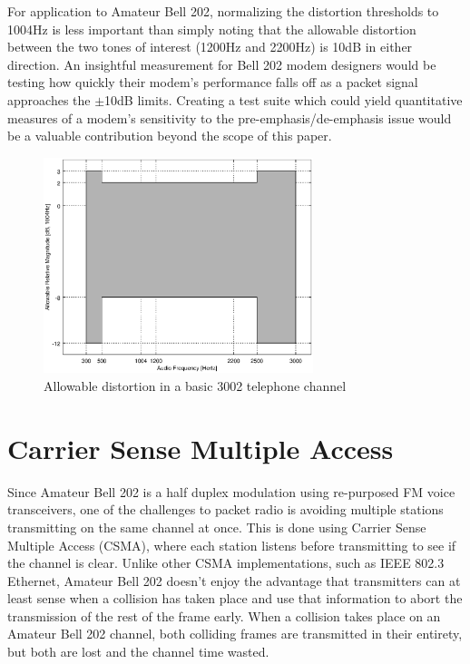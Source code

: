\documentclass[12pt,letterpaper]{article}
\begin{document}
For application to Amateur Bell 202, 
normalizing the distortion thresholds to 1004Hz is 
less important than simply noting that the allowable distortion between the two
tones of interest (1200Hz and 2200Hz) is 10dB in either direction.
An insightful measurement for Bell 202 modem designers would be testing how
quickly their modem's performance falls off as a packet signal approaches 
the $\pm$10dB limits.
Creating a test suite which could yield quantitative
measures of a modem's sensitivity to the pre-emphasis/de-emphasis issue would
be a valuable contribution beyond the scope of this paper.

\begin{figure}
	\centering
	\includegraphics[width=0.7\textwidth]{src/octave/3002}
	\caption{Allowable distortion in a basic 3002 telephone channel}
	\label{fig:3002}
\end{figure}


\section{Carrier Sense Multiple Access}
\label{sec:bell202csma}

Since Amateur Bell 202 is a half duplex modulation using re-purposed 
FM voice transceivers, 
one of the challenges to packet radio is avoiding multiple stations
transmitting on the same channel at once. 
This is done using Carrier Sense Multiple Access (CSMA),
where each station listens before transmitting to see if the channel is clear.
Unlike other CSMA implementations,
such as IEEE 802.3 Ethernet, 
Amateur Bell 202 doesn't enjoy the advantage that transmitters can
at least sense when a collision has taken place 
and use that information to abort the transmission of the rest of the frame early.
When a collision takes place on an Amateur Bell 202 channel, 
both colliding frames are transmitted in their entirety, but both are lost
and the channel time wasted.
\end{document}
